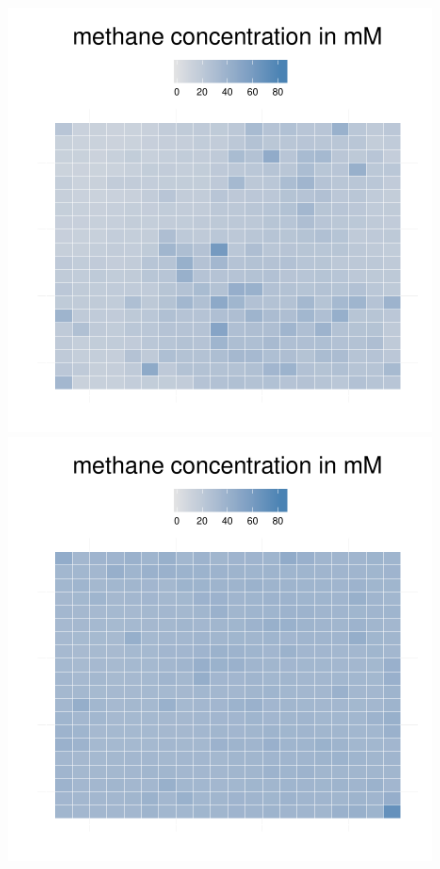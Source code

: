 \begin{figure}[h!]
{\begin{minipage}[t]{0.3\textwidth}
  \end{minipage}
  \begin{minipage}[t]{0.3\textwidth}
    \includegraphics[width=\textwidth]{../results/img/barkeri_20x20_seed9659_methane75.pdf}
  \end{minipage}
  \begin{minipage}[t]{0.3\textwidth}
    \includegraphics[width=\textwidth]{../results/img/barkeri_20x20_seed9659_methane100.pdf}

\end{minipage}}
\end{figure}
